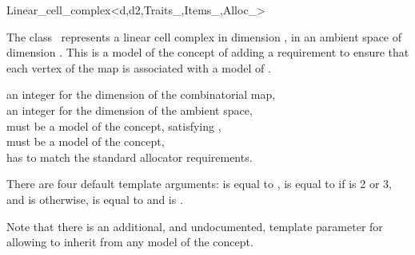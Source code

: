 \ccRefPageBegin
\begin{ccRefClass}{Linear_cell_complex<d,d2,Traits_,Items_,Alloc_>}


\ccDefinition
  
The class \ccRefName\ represents a linear cell complex in dimension ,
in an ambient space of dimension . This is a model of the concept of
 adding a requirement to ensure that
each vertex of the map is associated with a
model of .


\ccIsModel

\ccInheritsFrom
{}

\ccParameters
{} an integer for the dimension of the combinatorial map,\\
 an integer for the dimension of the ambient space,\\
 must be a model of the  concept, satisfying ,\\
 must be a model of the  concept,\\
 has to match the standard allocator requirements. 

There are four default template arguments:
 is equal to ,
 is equal to  if
 is 2 or 3, and is  otherwise,
 is equal to  and
 is .

\begin{ccAdvanced}
  Note that there is an additional, and undocumented, template
  parameter  for
   allowing
  to inherit from any model of the  concept.
\end{ccAdvanced}


\end{ccRefClass}
